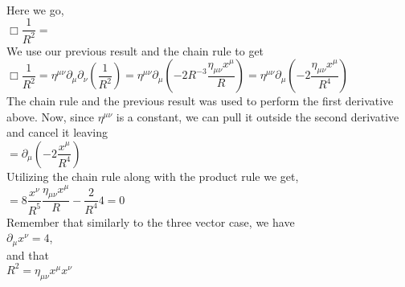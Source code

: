 \documentclass[prb,preprint]
{revtex4-1}
\begin{document}
\\
Here we go,
\\
$\Box \dfrac{1}{R^2} = $
\\
We use our previous result and the chain rule to get
\\
$\Box \dfrac{1}{R^2} = \eta^{\mu\nu}\partial_\mu \partial_\nu\left(\dfrac{1}{R^2}\right) = \eta^{\mu\nu}\partial_\mu\left(-2 R^{-3} \dfrac{\eta_{\mu\nu}x^\mu}{R}\right) = \eta^{\mu\nu}\partial_\mu\left(-2 \dfrac{\eta_{\mu\nu} x^\mu}{R^4}\right)$
\\
The chain rule and the previous result was used to perform the first derivative above.  Now, since $\eta^{\mu\nu}$ is a constant, we can pull it outside the second derivative and cancel it leaving
\\
$ = \partial_\mu\left(-2 \dfrac{x^\mu}{R^4}\right)$
\\
Utilizing the chain rule along with the product rule we get,
\\
$ = 8 \dfrac{x^\nu}{R^5}\dfrac{\eta_{\mu\nu} x^\mu}{R} - \dfrac{2}{R^4} 4 = 0$
\\
Remember that similarly to the three vector case, we have 
\\
$\partial_\mu x^\nu = 4$,
\\
and that
\\
$R^2 = \eta_{\mu\nu}x^\mu x^\nu$






\end{document}
